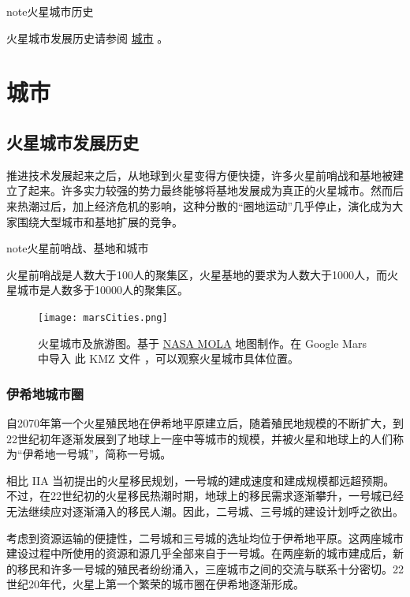 \documentclass[letterpaper,10pt]{sphinxmanual}
\begin{document}
\begin{notice}{note}{火星城市历史}

火星城市发展历史请参阅 \href{http://interimm.org/InterImmBook/cities.html}{城市} 。
\end{notice}


\section{城市}
\label{cities::doc}\label{cities:id1}

\subsection{火星城市发展历史}
\label{cities:id2}
推进技术发展起来之后，从地球到火星变得方便快捷，许多火星前哨战和基地被建立了起来。许多实力较强的势力最终能够将基地发展成为真正的火星城市。然而后来热潮过后，加上经济危机的影响，这种分散的“圈地运动”几乎停止，演化成为大家围绕大型城市和基地扩展的竞争。

\begin{notice}{note}{火星前哨战、基地和城市}

火星前哨战是人数大于100人的聚集区，火星基地的要求为人数大于1000人，而火星城市是人数多于10000人的聚集区。
\end{notice}
\begin{figure}[htbp]
\centering
\capstart

\texttt{[image: marsCities.png]}
\caption{火星城市及旅游图。基于 \href{http://mola.gsfc.nasa.gov/images.html}{NASA MOLA} 地图制作。在 Google Mars 中导入 此 KMZ 文件 ，可以观察火星城市具体位置。}\end{figure}


\subsubsection{伊希地城市圈}
\label{cities:index-1}\label{cities:id3}
自2070年第一个火星殖民地在伊希地平原建立后，随着殖民地规模的不断扩大，到22世纪初年逐渐发展到了地球上一座中等城市的规模，并被火星和地球上的人们称为“伊希地一号城”，简称一号城。

相比 IIA 当初提出的火星移民规划，一号城的建成速度和建成规模都远超预期。不过，在22世纪初的火星移民热潮时期，地球上的移民需求逐渐攀升，一号城已经无法继续应对逐渐涌入的移民人潮。因此，二号城、三号城的建设计划呼之欲出。

考虑到资源运输的便捷性，二号城和三号城的选址均位于伊希地平原。这两座城市建设过程中所使用的资源和源几乎全部来自于一号城。在两座新的城市建成后，新的移民和许多一号城的殖民者纷纷涌入，三座城市之间的交流与联系十分密切。22世纪20年代，火星上第一个繁荣的城市圈在伊希地逐渐形成。
\end{document}
